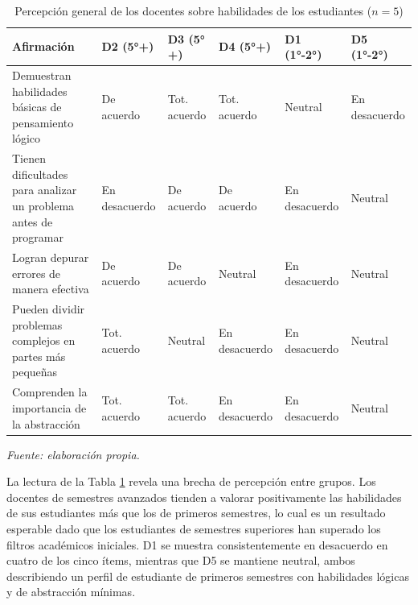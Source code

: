 \begin{table}[H]
\centering
\caption{Percepción general de los docentes sobre habilidades de los estudiantes ($n=5$)}
\label{tab:percepcion_docentes}
\footnotesize
\setlength{\tabcolsep}{3pt}

\begin{tabular}{
>{\raggedright\arraybackslash}p{5.0cm}
>{\centering\arraybackslash}p{1.8cm}
>{\centering\arraybackslash}p{1.8cm}
>{\centering\arraybackslash}p{1.8cm}
>{\centering\arraybackslash}p{1.8cm}
>{\centering\arraybackslash}p{1.8cm}
}
\hline
\textbf{Afirmación} & \textbf{D2 (5°+)} & \textbf{D3 (5°+)} & \textbf{D4 (5°+)} & \textbf{D1 (1°-2°)} & \textbf{D5 (1°-2°)} \\
\hline

Demuestran habilidades básicas de pensamiento lógico &
De acuerdo &
Tot. acuerdo &
Tot. acuerdo &
Neutral &
En desacuerdo \\

Tienen dificultades para analizar un problema antes de programar &
En desacuerdo &
De acuerdo &
De acuerdo &
En desacuerdo &
Neutral \\

Logran depurar errores de manera efectiva &
De acuerdo &
De acuerdo &
Neutral &
En desacuerdo &
Neutral \\

Pueden dividir problemas complejos en partes más pequeñas &
Tot. acuerdo &
Neutral &
En desacuerdo &
En desacuerdo &
Neutral \\

Comprenden la importancia de la abstracción &
Tot. acuerdo &
Tot. acuerdo &
En desacuerdo &
En desacuerdo &
Neutral \\
\hline

\end{tabular}

\vskip 4pt
\footnotesize\textit{Fuente: elaboración propia.}
\end{table}

\FloatBarrier

La lectura de la Tabla \ref{tab:percepcion_docentes} revela una brecha de percepción entre grupos. Los docentes de semestres avanzados tienden a valorar positivamente las habilidades de sus estudiantes más que los de primeros semestres, lo cual es un resultado esperable dado que los estudiantes de semestres superiores han superado los filtros académicos iniciales. D1 se muestra consistentemente en desacuerdo en cuatro de los cinco ítems, mientras que D5 se mantiene neutral, ambos describiendo un perfil de estudiante de primeros semestres con habilidades lógicas y de abstracción mínimas.

